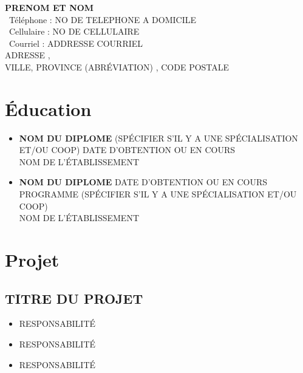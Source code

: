 \documentclass[twoside,letterpaper,11  pt]{article}
\begin{document}
\begin{center} %
{\Large \textbf{PRENOM ET NOM }}\\
\Telefon \, Téléphone : NO DE TELEPHONE A DOMICILE \\
\Mobilefone \, Cellulaire : NO DE CELLULAIRE \\
\Letter \, Courriel : ADDRESSE COURRIEL \\
ADRESSE , \\
VILLE, PROVINCE (ABRÉVIATION) , CODE POSTALE \\
\end{center}

\bigbreak

\begin{flushleft}

\bigbreak

\section*{Éducation} %

\begin{itemize}[label={}]

\item \textbf{NOM DU DIPLOME} (SPÉCIFIER S'IL Y A UNE SPÉCIALISATION ET/OU COOP) \hfill DATE D'OBTENTION OU EN COURS\\
NOM DE L'ÉTABLISSEMENT  \\

\vspace{0.2cm}

\item \textbf{NOM DU DIPLOME} \hfill  DATE D'OBTENTION OU EN COURS \\
PROGRAMME (SPÉCIFIER S'IL Y A UNE SPÉCIALISATION ET/OU COOP) \\
NOM DE L'ÉTABLISSEMENT \\
\end{itemize}

\section*{Projet} %

\subsection*{TITRE DU PROJET}
\begin{itemize}[label=\textbullet, font=  \scriptsize]
    \item RESPONSABILITÉ
    \item RESPONSABILITÉ
    \item RESPONSABILITÉ
\end{itemize}


\end{flushleft}
\end{document}
